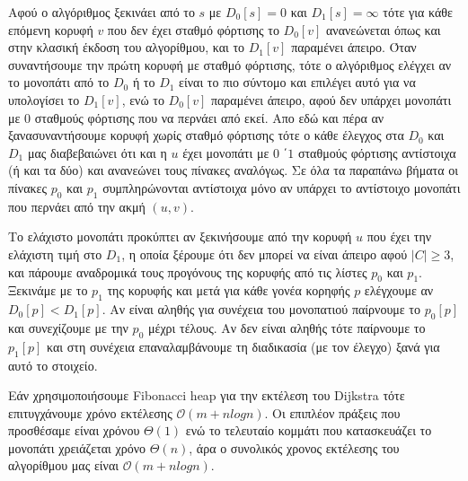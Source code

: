 \documentclass[a4paper,11pt]{article}
\begin{document}
Αφού ο αλγόριθμος ξεκινάει από το $s$ με $D_0[s]=0$ και $D_1[s]=\infty$ τότε για κάθε επόμενη κορυφή $v$ που δεν έχει σταθμό φόρτισης το $D_0[v]$ ανανεώνεται όπως και στην κλασική έκδοση του αλγορίθμου, και το $D_1[v]$ παραμένει άπειρο.
Όταν συναντήσουμε την πρώτη κορυφή με σταθμό φόρτισης, τότε ο αλγόριθμος ελέγχει αν το μονοπάτι από το $D_0$ ή το $D_1$ είναι το πιο σύντομο και επιλέγει αυτό για να υπολογίσει το $D_1[v]$, ενώ το $D_0[v]$ παραμένει άπειρο, αφού δεν υπάρχει μονοπάτι με $0$ σταθμούς φόρτισης που να περνάει από εκεί.
Απο εδώ και πέρα αν ξανασυναντήσουμε κορυφή χωρίς σταθμό φόρτισης τότε ο κάθε έλεγχος στα $D_0$ και $D_1$ μας διαβεβαιώνει ότι και η $u$ έχει μονοπάτι με $0$ ΄$1$ σταθμούς φόρτισης αντίστοιχα (ή και τα δύο) και ανανεώνει τους πίνακες αναλόγως.
Σε όλα τα παραπάνω βήματα οι πίνακες $p_0$ και $p_1$ συμπληρώνονται αντίστοιχα μόνο αν υπάρχει το αντίστοιχο μονοπάτι που περνάει από την ακμή $(u,v)$.

Το ελάχιστο μονοπάτι προκύπτει αν ξεκινήσουμε από την κορυφή $u$ που έχει την ελάχιστη τιμή στο $D_1$, η οποία ξέρουμε ότι δεν μπορεί να είναι άπειρο αφού $|C|\geq 3$, και πάρουμε αναδρομικά τους προγόνους της κορυφής από τις λίστες $p_0$ και $p_1$.
Ξεκινάμε με το $p_1$ της κορυφής και μετά για κάθε γονέα κορηφής $p$ ελέγχουμε αν $D_0[p] < D_1[p]$.
Αν είναι αληθής για συνέχεια του μονοπατιού παίρνουμε το $p_0[p]$ και συνεχίζουμε με την $p_0$ μέχρι τέλους.
Αν δεν είναι αληθής τότε παίρνουμε το $p_1[p]$ και στη συνέχεια επαναλαμβάνουμε τη διαδικασία (με τον έλεγχο) ξανά για αυτό το στοιχείο.

Εάν χρησιμοποιήσουμε Fibonacci heap για την εκτέλεση του Dijkstra τότε επιτυγχάνουμε χρόνο εκτέλεσης $\mathcal{O}(m+nlogn)$. Οι επιπλέον πράξεις που προσθέσαμε είναι χρόνου $\Theta(1)$ ενώ το τελευταίο κομμάτι που κατασκευάζει το μονοπάτι χρειάζεται χρόνο $\Theta(n)$, άρα ο συνολικός χρονος εκτέλεσης του αλγορίθμου μας είναι $\mathcal{O}(m+nlogn)$.
\end{document}
